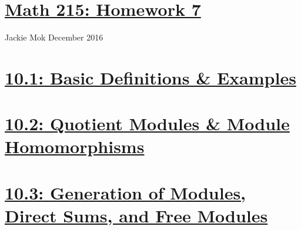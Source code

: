 \documentclass{article}
\begin{document}
\section*{\underline{Math 215: Homework 7}}
Jackie Mok
 December 2016

\section*{\underline{10.1: Basic Definitions \& Examples}}



\section*{\underline{10.2: Quotient Modules \& Module Homomorphisms}}



\section*{\underline{10.3: Generation of Modules, Direct Sums, and Free Modules}}



\end{document}
